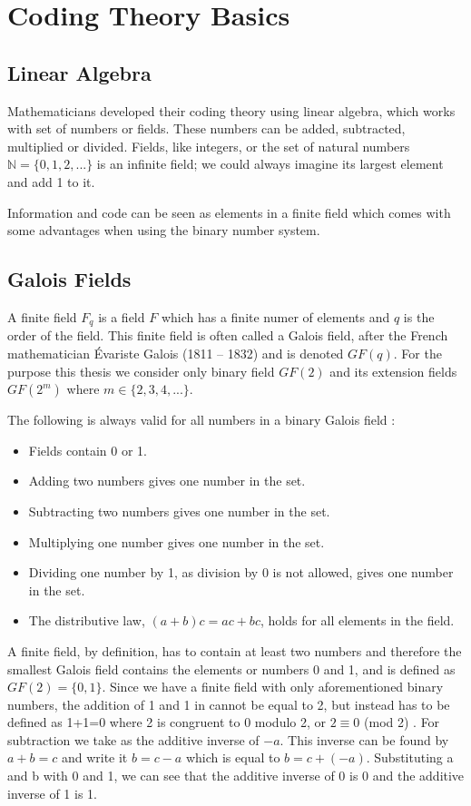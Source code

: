 \documentclass[../main.tex]{subfiles}
\begin{document}
    \chapter{Coding Theory Basics}

    \section{Linear Algebra}
    Mathematicians developed their coding theory using linear algebra, which works with set of numbers or fields. These numbers can be added, subtracted, multiplied or divided. Fields, like integers, or the set of natural numbers ${\mathbb{N} = \{0, 1, 2, ...\}}$ is an infinite field; we could always imagine its largest element and add 1 to it.

    Information and code can be seen as elements in a finite field which comes with some advantages when using the binary number system.


    \section{Galois Fields}
    A finite field ${F_q}$ is a field ${F}$ which has a finite numer of elements and ${q}$ is the order of the field. This finite field is often called a Galois field, after the French mathematician Évariste Galois (1811 – 1832) and is denoted ${GF(q)}$. For the purpose this thesis we consider only binary field ${GF(2)}$ and its extension fields ${GF(2^m)}$ where ${m \in \{2, 3, 4, ...\}}$.

    The following is always valid for all numbers in a binary Galois field \autocite{blahut1983theory}:

    \begin{itemize}
        \item Fields contain 0 or 1.
        \item Adding two numbers gives one number in the set.
        \item Subtracting two numbers gives one number in the set.
        \item Multiplying one number gives one number in the set.
        \item Dividing one number by 1, as division by 0 is not allowed, gives one number in the set.
        \item The distributive law, ${(a+b)c = ac+bc}$, holds for all elements in the field.
    \end{itemize}

    A finite field, by definition, has to contain at least two numbers and therefore the smallest Galois field contains the elements or numbers 0 and 1, and is defined as ${GF(2)=\{0,1\}}$. Since we have a finite field with only aforementioned binary numbers, the addition of 1 and 1 in  cannot be equal to 2, but instead has to be defined as 1+1=0 where 2 is congruent to 0 modulo 2, or ${2 \equiv 0}$ (mod 2) \autocite{hill1986first}. For subtraction we take as the additive inverse of ${-a}$. This inverse can be found by ${a+b=c}$ and write it ${b=c-a}$ which is equal to ${b=c+(-a)}$. Substituting a and b with 0 and 1, we can see that the additive inverse of 0 is 0 and the additive inverse of 1 is 1.
\end{document}

